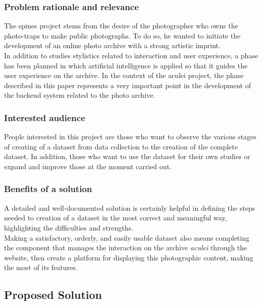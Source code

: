 \documentclass[12pt,a4paper,twoside]{article}
\begin{document}
\subsubsection{Problem rationale and relevance}
The spines project stems from the desire of the photographer who owns the photo-traps to make public photographs. To do so, he wanted to initiate the development of an online photo archive with a strong artistic imprint. \\ In addition to studies stylistics related to interaction and user experience, a phase has been planned in which artificial intelligence is applied so that it guides the user experience on the archive. In the context of the aculei project, the phase described in this paper represents a very important point in the development of the backend system related to the photo archive.

\subsubsection{Interested audience}
People interested in this project are those who want to observe the various stages of creating 
of a dataset from data collection to the creation of the complete dataset. In addition, 
those who want to use the dataset for their own studies or expand 
and improve those at the moment carried out.

\subsubsection{Benefits of a solution}
A detailed and well-documented solution is certainly helpful in defining the steps needed to 
creation of a dataset in the most correct and meaningful way, highlighting the difficulties and strengths. \\ Making a satisfactory, orderly, and easily usable dataset also means completing the 
component that manages the interaction on the archive \textit{aculei} through the website, then 
create a platform for displaying this photographic content, making the most of its 
features. 

\subsection{Proposed Solution}
\end{document}
